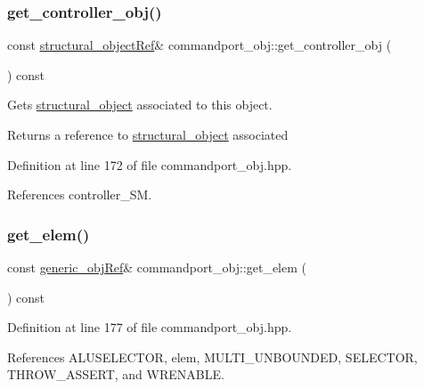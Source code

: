 \subsubsection{\texorpdfstring{get\+\_\+controller\+\_\+obj()}{get\_controller\_obj()}}
{\footnotesize\ttfamily const \hyperlink{structural__objects_8hpp_a8ea5f8cc50ab8f4c31e2751074ff60b2}{structural\+\_\+object\+Ref}\& commandport\+\_\+obj\+::get\+\_\+controller\+\_\+obj (\begin{DoxyParamCaption}{ }\end{DoxyParamCaption}) const\hspace{0.3cm}{\ttfamily [inline]}}



Gets \hyperlink{classstructural__object}{structural\+\_\+object} associated to this object. 

\begin{DoxyReturn}{Returns}
a reference to \hyperlink{classstructural__object}{structural\+\_\+object} associated 
\end{DoxyReturn}


Definition at line 172 of file commandport\+\_\+obj.\+hpp.



References controller\+\_\+\+SM.

\mbox{\label{classcommandport__obj_ace1e0dbfe89561ffebf2f68fc7ba5c01}} 
\subsubsection{\texorpdfstring{get\+\_\+elem()}{get\_elem()}}
{\footnotesize\ttfamily const \hyperlink{generic__obj_8hpp_acb533b2ef8e0fe72e09a04d20904ca81}{generic\+\_\+obj\+Ref}\& commandport\+\_\+obj\+::get\+\_\+elem (\begin{DoxyParamCaption}{ }\end{DoxyParamCaption}) const\hspace{0.3cm}{\ttfamily [inline]}}



Definition at line 177 of file commandport\+\_\+obj.\+hpp.



References A\+L\+U\+S\+E\+L\+E\+C\+T\+OR, elem, M\+U\+L\+T\+I\+\_\+\+U\+N\+B\+O\+U\+N\+D\+ED, S\+E\+L\+E\+C\+T\+OR, T\+H\+R\+O\+W\+\_\+\+A\+S\+S\+E\+RT, and W\+R\+E\+N\+A\+B\+LE.

